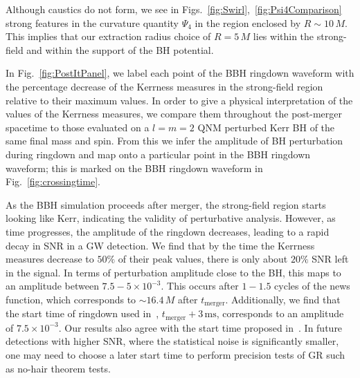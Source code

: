 

Although caustics do not form, we see in Figs.~\ref{fig:Swirl},~\ref{fig:Psi4Comparison} strong features in the curvature quantity $\Psi_4$ in the region enclosed by $R \sim 10\,M$. This implies that our extraction radius choice of $R=5\,M$ lies within the strong-field and within the support of the BH potential.


In Fig.~\ref{fig:PostItPanel}, we label each point of the BBH ringdown waveform with the percentage decrease of the Kerrness measures in the strong-field region relative to their maximum values.
In order to give a physical interpretation of the values of the Kerrness measures, we compare them throughout the post-merger spacetime to those evaluated on a $l=m=2$ QNM perturbed Kerr BH of the same final mass and spin. From this we infer the amplitude of BH perturbation during ringdown and map onto a particular point in the BBH ringdown waveform; this is marked on the BBH ringdown waveform in Fig.~\ref{fig:crossingtime}. 

As the BBH simulation proceeds after merger, the strong-field region starts looking like Kerr, indicating the validity of perturbative analysis. However, as time progresses, the amplitude of the ringdown decreases, leading to a rapid decay in SNR in a GW detection. We find that by the time the Kerrness measures decrease to $50\%$ of their peak values, there is only about $20\%$ SNR left in the signal. In terms of perturbation amplitude close to the BH, this maps to an amplitude between $7.5 - 5 \times 10^{-3}$. This occurs after $1 - 1.5$ cycles of the news function, which corresponds to $\sim 16.4\,M$ after $t_\mathrm{merger}$. Additionally, we find that the
 start time of ringdown used in~\cite{TheLIGOScientific:2016src}, $t_\mathrm{merger} + 3\,\mathrm{ms}$, corresponds to an amplitude of $7.5 \times 10^{-3}$. Our results also agree with the start time proposed  in~\cite{HilberHuang}. In future detections with higher SNR, where the statistical noise is significantly smaller, one may need to choose a later start time to perform precision tests of GR such as no-hair theorem tests. 

